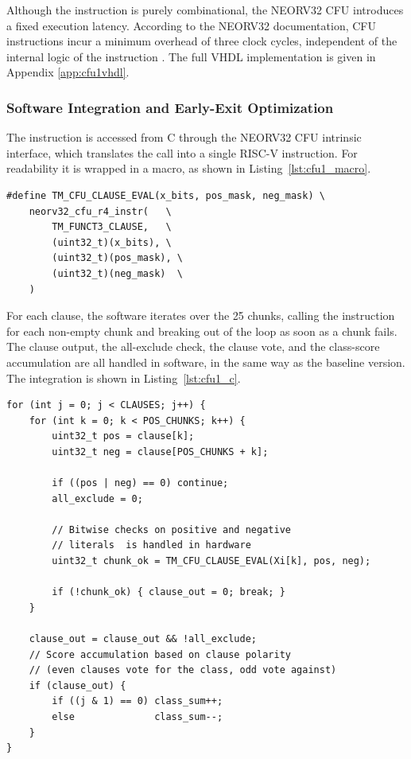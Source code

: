 Although the instruction is purely combinational, the NEORV32 CFU introduces a
fixed execution latency. According to the NEORV32 documentation, CFU
instructions incur a minimum overhead of three clock cycles, independent of the
internal logic of the instruction \cite{Nolting2024Datasheet}. The full VHDL
implementation is given in Appendix \ref{app:cfu1vhdl}.

\subsubsection{Software Integration and Early-Exit Optimization}
\label{sec:cfu_design1_sw}

The instruction is accessed from C through the NEORV32 CFU intrinsic interface,
which translates the call into a single RISC-V instruction. For readability it
is wrapped in a macro, as shown in Listing~\ref{lst:cfu1_macro}.

\begin{code}
\label{lst:cfu1_macro}
\begin{verbatim}
#define TM_CFU_CLAUSE_EVAL(x_bits, pos_mask, neg_mask) \
    neorv32_cfu_r4_instr(   \
        TM_FUNCT3_CLAUSE,   \
        (uint32_t)(x_bits), \
        (uint32_t)(pos_mask), \
        (uint32_t)(neg_mask)  \
    )
\end{verbatim}
\end{code}

For each clause, the software iterates over the 25 chunks, calling the instruction for each non-empty chunk and breaking out of the loop as soon as a chunk fails. The clause output, the all-exclude check, the clause vote, and the class-score accumulation are all handled in software, in the same way as the baseline version. The integration is shown in Listing~\ref{lst:cfu1_c}.

\begin{code}
\label{lst:cfu1_c}
\begin{verbatim}
for (int j = 0; j < CLAUSES; j++) {
    for (int k = 0; k < POS_CHUNKS; k++) {
        uint32_t pos = clause[k];
        uint32_t neg = clause[POS_CHUNKS + k];

        if ((pos | neg) == 0) continue;
        all_exclude = 0;
        
        // Bitwise checks on positive and negative 
        // literals  is handled in hardware
        uint32_t chunk_ok = TM_CFU_CLAUSE_EVAL(Xi[k], pos, neg);

        if (!chunk_ok) { clause_out = 0; break; }
    }

    clause_out = clause_out && !all_exclude;
    // Score accumulation based on clause polarity
    // (even clauses vote for the class, odd vote against)
    if (clause_out) {
        if ((j & 1) == 0) class_sum++;
        else              class_sum--;
    }
}

\end{verbatim}
\end{code}

